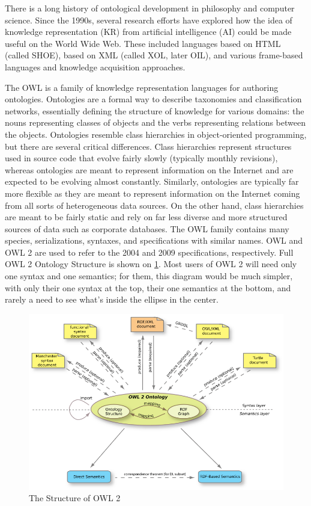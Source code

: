 \documentclass[thesis=M,english,hidelinks]{FITthesis}[2019/12/23]
\begin{document}
There is a long history of ontological development in philosophy and computer science. Since the 1990s, several research efforts have explored how the idea of knowledge representation (KR) from artificial intelligence (AI) could be made useful on the World Wide Web. These included languages based on HTML (called SHOE), based on XML (called XOL, later OIL), and various frame-based languages and knowledge acquisition approaches.

The \gls{OWL} is a family of knowledge representation languages for authoring ontologies\cite{owl_reference}. Ontologies are a formal way to describe taxonomies and classification networks, essentially defining the structure of knowledge for various domains: the nouns representing classes of objects and the verbs representing relations between the objects. Ontologies resemble class hierarchies in object-oriented programming, but there are several critical differences. Class hierarchies represent structures used in source code that evolve fairly slowly (typically monthly revisions), whereas ontologies are meant to represent information on the Internet and are expected to be evolving almost constantly. Similarly, ontologies are typically far more flexible as they are meant to represent information on the Internet coming from all sorts of heterogeneous data sources. On the other hand, class hierarchies are meant to be fairly static and rely on far less diverse and more structured sources of data such as corporate databases. The OWL family contains many species, serializations, syntaxes, and specifications with similar names. OWL and OWL 2 are used to refer to the 2004 and 2009 specifications, respectively. Full OWL 2 Ontology Structure is shown on \ref{fig:owl2structure}. Most users of OWL 2 will need only one syntax and one semantics; for them, this diagram would be much simpler, with only their one syntax at the top, their one semantics at the bottom, and rarely a need to see what's inside the ellipse in the center.

\begin{figure}
	\centering
	\includegraphics[width=1.0\linewidth]{owl2_structure}
	\caption{The Structure of OWL 2}
	\label{fig:owl2structure}
\end{figure}
\end{document}
